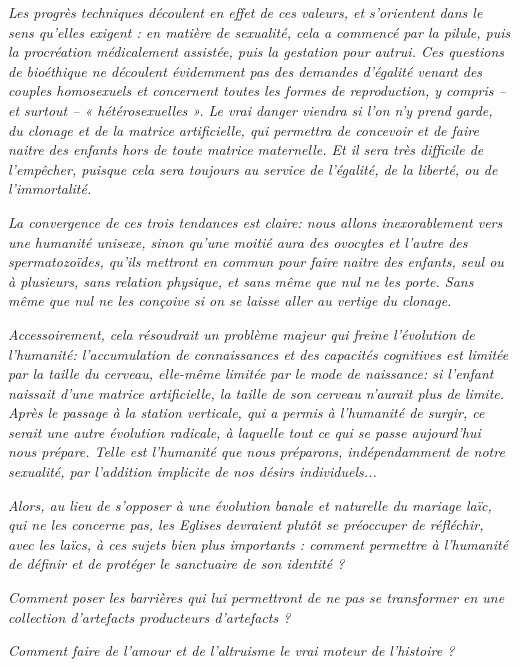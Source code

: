 \begin{displayquote}
\emph{\quarto Les progrès techniques découlent en effet de ces valeurs, et s'orientent dans le sens qu'elles exigent : en matière de sexualité, cela a commencé par la pilule, puis la procréation médicalement assistée, puis la gestation pour autrui. Ces questions de bioéthique ne découlent évidemment pas des demandes d'égalité venant des couples homosexuels et concernent toutes les formes de reproduction, y compris -- et surtout -- « hétérosexuelles ». Le vrai danger viendra si l'on n'y prend garde, du clonage et de la matrice artificielle, qui permettra de concevoir et de faire naitre des enfants hors de toute matrice maternelle. Et il sera très difficile de l'empêcher, puisque cela sera toujours au service de l'égalité, de la liberté, ou de l'immortalité.}
 
\emph{ La convergence de ces trois tendances est claire: nous allons inexorablement vers une humanité unisexe, sinon qu'une moitié aura des ovocytes et l'autre des spermatozoïdes, qu'ils mettront en commun pour faire naitre des enfants, seul ou à plusieurs, sans relation physique, et sans même que nul ne les porte. Sans même que nul ne les conçoive si on se laisse aller au vertige du clonage.}
 
\emph{ Accessoirement, cela résoudrait un problème majeur qui freine l'évolution de l'humanité: l'accumulation de connaissances et des capacités cognitives est limitée par la taille du cerveau, elle-même limitée par le mode de naissance: si l'enfant naissait d'une matrice artificielle, la taille de son cerveau n'aurait plus de limite. Après le passage à la station verticale, qui a permis à l'humanité de surgir, ce serait une autre évolution radicale, à laquelle tout ce qui se passe aujourd'hui nous prépare. Telle est l'humanité que nous préparons, indépendamment de notre sexualité, par l'addition implicite de nos désirs individuels...}


\emph{Alors, au lieu de s'opposer à une évolution banale et naturelle du mariage laïc, qui ne les concerne pas, les Eglises devraient plutôt se préoccuper de réfléchir, avec les laïcs, à ces sujets bien plus importants : comment permettre à l'humanité de définir et de protéger le sanctuaire de son identité ?}

\emph{Comment poser les barrières qui lui permettront de ne pas se transformer en une collection d'artefacts producteurs d'artefacts ?}

\emph{Comment faire de l'amour et de l'altruisme le vrai moteur de l'histoire ?}


\end{displayquote}


